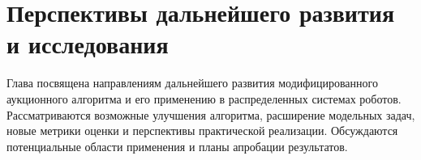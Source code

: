 \chapter{Перспективы дальнейшего развития и исследования}
\label{ch5}

Глава посвящена направлениям дальнейшего развития модифицированного аукционного алгоритма и его применению в распределенных системах роботов. Рассматриваются возможные улучшения алгоритма, расширение модельных задач, новые метрики оценки и перспективы практической реализации. Обсуждаются потенциальные области применения и планы апробации результатов.